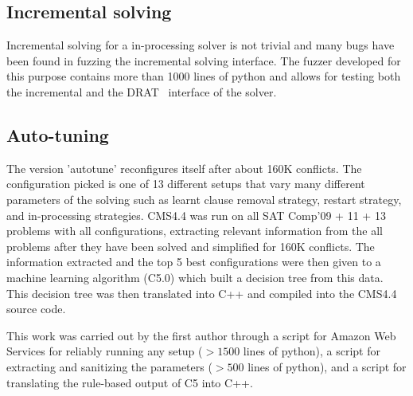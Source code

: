 \documentclass[final]{ieee}
\begin{document}
\subsection{Incremental solving}
Incremental solving for a in-processing solver is not trivial and many bugs have been found in fuzzing the incremental solving interface. The fuzzer developed for this purpose contains more than 1000 lines of python and allows for testing both the incremental and the DRAT~\cite{drat} interface of the solver.

\subsection{Auto-tuning}
The version 'autotune' reconfigures itself after about 160K conflicts. The configuration picked is one of 13 different setups that vary many different parameters of the solving such as learnt clause removal strategy, restart strategy, and in-processing strategies. CMS4.4 was run on all SAT Comp'09 + 11 + 13 problems with all configurations, extracting relevant information from the all problems after they have been solved and simplified for 160K conflicts. The information extracted and the top 5 best configurations were then given to a machine learning algorithm (C5.0\cite{Quinlan:1993:CPM:152181}) which built a decision tree from this data. This decision tree was then translated into C++ and compiled into the CMS4.4 source code.

This work was carried out by the first author through a script for Amazon Web Services for reliably running any setup ($>1500$ lines of python), a script for extracting and sanitizing the parameters ($>500$ lines of python), and a script for translating the rule-based output of C5 into C++.




\vfill
\pagebreak
\end{document}
